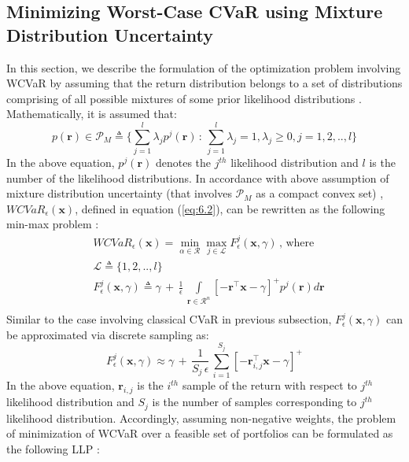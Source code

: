 \subsection {Minimizing Worst-Case CVaR using Mixture Distribution Uncertainty}
In this section, we describe the formulation of the optimization problem involving WCVaR by assuming that the return distribution belongs to a set of distributions comprising of all possible mixtures of some prior likelihood distributions \cite{zhu}. Mathematically, it is assumed that:
\begin{equation}
\label{eq:6.8}
p(\mathbf{r}) \in \mathcal{P}_{M} \triangleq \bigg\{ \sum_{j=1}^{l} \lambda_{j}p^{j}(\mathbf{r}) \, : \, \sum_{j=1}^{l}\lambda_{j}=1, \lambda_{j} \geq 0,j=1,2,..,l \bigg\}
\end{equation}
In the above equation, $p^{j}(\mathbf{r})$ denotes the $j^{th}$ likelihood distribution and $l$ is the number of the likelihood distributions. In accordance with above assumption of mixture distribution uncertainty (that involves $\mathcal{P}_{M}$ as a compact convex set) , $WCVaR_{\epsilon}(\mathbf{x})$, defined in equation (\ref{eq:6.2}), can be rewritten as the following min-max problem \cite{zhu}: 
\begin{equation}
\label{eq:6.9}
\begin{split}
& WCVaR_{\epsilon}(\mathbf{x}) = \min_{\alpha \in \mathcal{R}} \max_{j \in \mathcal{L} } F_{\epsilon}^{j}(\mathbf{x},\gamma) \, , \, \text{where} \\
& \mathcal{L} \triangleq \{ 1,2,..,l \} \\
& F_{\epsilon}^{j}(\mathbf{x},\gamma) \triangleq \gamma \, + \, \frac{1}{\epsilon} \, \int \limits_{\mathbf{r} \in \mathcal{R}^{n}} [-\mathbf{r}^{\top}\mathbf{x}-\gamma]^{+} p^{j}(\mathbf{r})  d\mathbf{r} \\
\end{split}
\end{equation}
Similar to the case involving classical CVaR in previous subsection, $F_{\epsilon}^{j}(\mathbf{x},\gamma)$ can be approximated via discrete sampling as:
\begin{equation}
\label{eq:6.10}
F_{\epsilon}^{j}(\mathbf{x},\gamma) \approx \gamma \, + \, \frac{1}{S_{j} \, \epsilon} \, \sum_{i=1}^{S_{j}} [-\mathbf{r}_{i,j}^{\top}\mathbf{x}-\gamma]^{+}
\end{equation}
In the above equation, $\mathbf{r}_{i,j}$ is the $i^{th}$ sample of the return with respect to $j^{th}$ likelihood distribution and $S_{j}$ is the number of samples corresponding to $j^{th}$ likelihood distribution. Accordingly, assuming non-negative weights, the problem of minimization of WCVaR over a feasible set of portfolios can be formulated as the following LLP \cite{zhu}:
